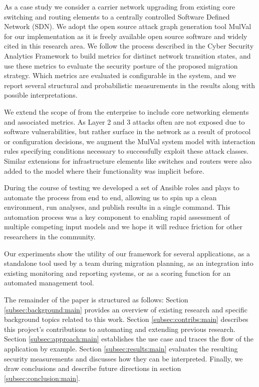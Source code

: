 As a case study we consider a carrier network upgrading from existing core switching and routing elements to a centrally controlled Software Defined Network (SDN). We adopt the open source attack graph generation tool MulVal\cite{Ou_Appel_2005} for our implementation as it is freely available open source software and widely cited in this research area. We follow the process described in the Cyber Security Analytics Framework\cite{Abraham_Nair_2015a} to build metrics for distinct network transition states, and use these metrics to evaluate the security posture of the proposed migration strategy. Which metrics are evaluated is configurable in the system, and we report several structural and probabilistic measurements in the results along with possible interpretations. 

We extend the scope of \cite{Abraham_2016} from the enterprise to include core networking elements and associated metrics. As Layer 2 and 3 attacks often are not exposed due to software vulnerabilities, but rather surface in the network as a result of protocol or configuration decisions, we augment the MulVal system model with interaction rules specifying conditions necessary to successfully exploit these attack classes. Similar extensions for infrastructure elements like switches and routers were also added to the model where their functionality was implicit before.

During the course of testing we developed a set of Ansible roles and plays to automate the process from end to end, allowing us to spin up a clean environment, run analyses, and publish results in a single command. This automation process was a key component to enabling rapid assessment of multiple competing input models and we hope it will reduce friction for other researchers in the community.

Our experiments show the utility of our framework for several applications, as a standalone tool used by a team during migration planning, as an integration into existing monitoring and reporting systems, or as a scoring function for an automated management tool. 

The remainder of the paper is structured as follows: Section \ref{subsec:background:main} provides an overview of existing research and specific background topics related to this work. Section \ref{subsec:contribs:main} describes this project's contributions to automating and extending previous research. Section \ref{subsec:approach:main} establishes the use case and traces the flow of the application by example. Section \ref{subsec:results:main} evaluates the resulting security measurements and discusses how they can be interpreted. Finally, we draw conclusions and describe future directions in section \ref{subsec:conclusion:main}.



